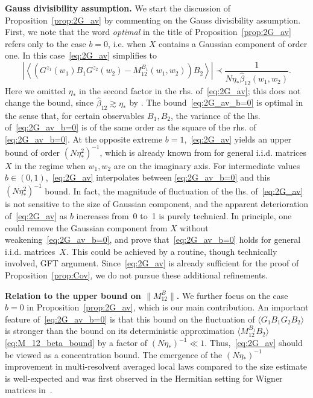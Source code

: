 \documentclass[10pt]{amsart}
\numberwithin{equation}{section}
\begin{document}
\textbf{Gauss divisibility assumption.} We start the discussion of Proposition~\ref{prop:2G_av} by commenting on the Gauss divisibility assumption. First, we note that the word \emph{optimal} in the title of Proposition~\ref{prop:2G_av} refers only to the case $b=0$, i.e. when $X$ contains a Gaussian component of order one. In this case~\eqref{eq:2G_av} simplifies to
\begin{equation}
\left\vert \left\langle \left(G^{z_1}(w_1)B_1G^{z_2}(w_2)-M_{12}^{B_1}(w_1,w_2)\right)B_2\right\rangle\right\vert \prec \frac{1}{N\eta_*\widehat{\beta}_{12}(w_1,w_2)}.
\label{eq:2G_av_b=0}
\end{equation}  
Here we omitted $\eta_*$ in the second factor in the rhs. of~\eqref{eq:2G_av}; this does not change the bound, since $\widehat{\beta}_{12}\gtrsim \eta_*$ by \cite[Lemma 6.1]{macroCLT_real}. The bound~\eqref{eq:2G_av_b=0} is optimal in the sense that, for certain observables $B_1,B_2$, the variance of the lhs. of~\eqref{eq:2G_av_b=0} is of the same order as the square of the rhs. of \eqref{eq:2G_av_b=0}. At the opposite extreme $b=1$,~\eqref{eq:2G_av} yields an upper bound of order $(N\eta_*^2)^{-1}$, which is already known from \cite[Theorem~3.4]{nonHermdecay} for general i.i.d. matrices $X$ in the regime when $w_1,w_2$ are on the imaginary axis. For intermediate values $b\in (0,1)$,~\eqref{eq:2G_av} interpolates between \eqref{eq:2G_av_b=0} and this $(N\eta_*^2)^{-1}$ bound. In fact, the magnitude of fluctuation of the lhs. of~\eqref{eq:2G_av} is not sensitive to the size of Gaussian component, and the apparent deterioration of~\eqref{eq:2G_av} as $b$ increases from~0 to~1 is purely technical. In principle, one could remove the Gaussian component from $X$ without weakening~\eqref{eq:2G_av_b=0}, and prove that~\eqref{eq:2G_av_b=0} holds for general i.i.d. matrices~$X$. This could be achieved by a routine, though technically involved, GFT argument. Since~\eqref{eq:2G_av} is already sufficient for the proof of Proposition~\ref{prop:Cov}, we do not pursue these additional refinements.

\smallskip

\textbf{Relation to the upper bound on $\|M_{12}^B\|$.} We further focus on the case $b=0$ in Proposition~\ref{prop:2G_av}, which is our main contribution. An important feature of~\eqref{eq:2G_av_b=0} is that this bound on the fluctuation of $\langle G_1B_1G_2B_2\rangle$ is  stronger than the bound on its deterministic approximation $\langle M_{12}^{B_1}B_2\rangle$  \eqref{eq:M_12_beta_bound} by a factor of $(N\eta_*)^{-1}\ll 1$. Thus,~\eqref{eq:2G_av} should be viewed as a concentration bound. The emergence of the $(N\eta_*)^{-1}$ improvement in multi-resolvent averaged local laws compared to the size estimate is well-expected and was first observed in the Hermitian setting for Wigner matrices in~\cite{Multi_res_llaws}.
\end{document}
